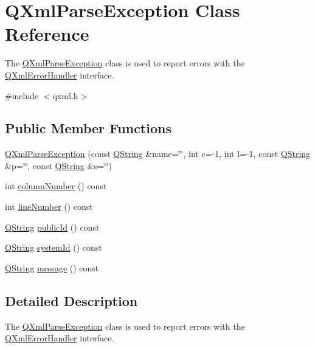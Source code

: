 \hypertarget{class_q_xml_parse_exception}{}\section{Q\+Xml\+Parse\+Exception Class Reference}
\label{class_q_xml_parse_exception}


The \mbox{\hyperlink{class_q_xml_parse_exception}{Q\+Xml\+Parse\+Exception}} class is used to report errors with the \mbox{\hyperlink{class_q_xml_error_handler}{Q\+Xml\+Error\+Handler}} interface.  




{\ttfamily \#include $<$qxml.\+h$>$}

\subsection*{Public Member Functions}
\begin{DoxyCompactItemize}
\item 
\mbox{\hyperlink{class_q_xml_parse_exception_a3ebf6309461dea4ad1df751e8e95ed2b}{Q\+Xml\+Parse\+Exception}} (const \mbox{\hyperlink{class_q_string}{Q\+String}} \&name=\char`\"{}\char`\"{}, int c=-\/1, int l=-\/1, const \mbox{\hyperlink{class_q_string}{Q\+String}} \&p=\char`\"{}\char`\"{}, const \mbox{\hyperlink{class_q_string}{Q\+String}} \&s=\char`\"{}\char`\"{})
\item 
int \mbox{\hyperlink{class_q_xml_parse_exception_a0421d03f5e256214046c6141401c7002}{column\+Number}} () const
\item 
int \mbox{\hyperlink{class_q_xml_parse_exception_a342274677e7ea114c23dbb5dda8aa3da}{line\+Number}} () const
\item 
\mbox{\hyperlink{class_q_string}{Q\+String}} \mbox{\hyperlink{class_q_xml_parse_exception_aca4a620727773b30d458991237cd39eb}{public\+Id}} () const
\item 
\mbox{\hyperlink{class_q_string}{Q\+String}} \mbox{\hyperlink{class_q_xml_parse_exception_ab4e0f0552847dcecbb18250c654d99d5}{system\+Id}} () const
\item 
\mbox{\hyperlink{class_q_string}{Q\+String}} \mbox{\hyperlink{class_q_xml_parse_exception_a2079f8dab183efb5f2fe30c686e96f12}{message}} () const
\end{DoxyCompactItemize}


\subsection{Detailed Description}
The \mbox{\hyperlink{class_q_xml_parse_exception}{Q\+Xml\+Parse\+Exception}} class is used to report errors with the \mbox{\hyperlink{class_q_xml_error_handler}{Q\+Xml\+Error\+Handler}} interface. 

